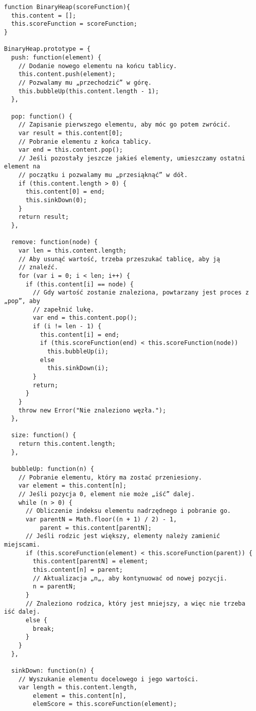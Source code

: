 \begin{verbatim} 
function BinaryHeap(scoreFunction){
  this.content = [];
  this.scoreFunction = scoreFunction;
}

BinaryHeap.prototype = {
  push: function(element) {
    // Dodanie nowego elementu na końcu tablicy.
    this.content.push(element);
    // Pozwalamy mu „przechodzić” w górę.
    this.bubbleUp(this.content.length - 1);
  },

  pop: function() {
    // Zapisanie pierwszego elementu, aby móc go potem zwrócić.
    var result = this.content[0];
    // Pobranie elementu z końca tablicy.
    var end = this.content.pop();
    // Jeśli pozostały jeszcze jakieś elementy, umieszczamy ostatni element na
    // początku i pozwalamy mu „przesiąknąć” w dół.
    if (this.content.length > 0) {
      this.content[0] = end;
      this.sinkDown(0);
    }
    return result;
  },

  remove: function(node) {
    var len = this.content.length;
    // Aby usunąć wartość, trzeba przeszukać tablicę, aby ją
    // znaleźć.
    for (var i = 0; i < len; i++) {
      if (this.content[i] == node) {
        // Gdy wartość zostanie znaleziona, powtarzany jest proces z „pop”, aby
        // zapełnić lukę.
        var end = this.content.pop();
        if (i != len - 1) {
          this.content[i] = end;
          if (this.scoreFunction(end) < this.scoreFunction(node))
            this.bubbleUp(i);
          else
            this.sinkDown(i);
        }
        return;
      }
    }
    throw new Error("Nie znaleziono węzła.");
  },

  size: function() {
    return this.content.length;
  },

  bubbleUp: function(n) {
    // Pobranie elementu, który ma zostać przeniesiony.
    var element = this.content[n];
    // Jeśli pozycja 0, element nie może „iść” dalej.
    while (n > 0) {
      // Obliczenie indeksu elementu nadrzędnego i pobranie go.
      var parentN = Math.floor((n + 1) / 2) - 1,
          parent = this.content[parentN];
      // Jeśli rodzic jest większy, elementy należy zamienić miejscami.
      if (this.scoreFunction(element) < this.scoreFunction(parent)) {
        this.content[parentN] = element;
        this.content[n] = parent;
        // Aktualizacja „n„, aby kontynuować od nowej pozycji.
        n = parentN;
      }
      // Znaleziono rodzica, który jest mniejszy, a więc nie trzeba iść dalej.
      else {
        break;
      }
    }
  },

  sinkDown: function(n) {
    // Wyszukanie elementu docelowego i jego wartości.
    var length = this.content.length,
        element = this.content[n],
        elemScore = this.scoreFunction(element);


\end{verbatim}
